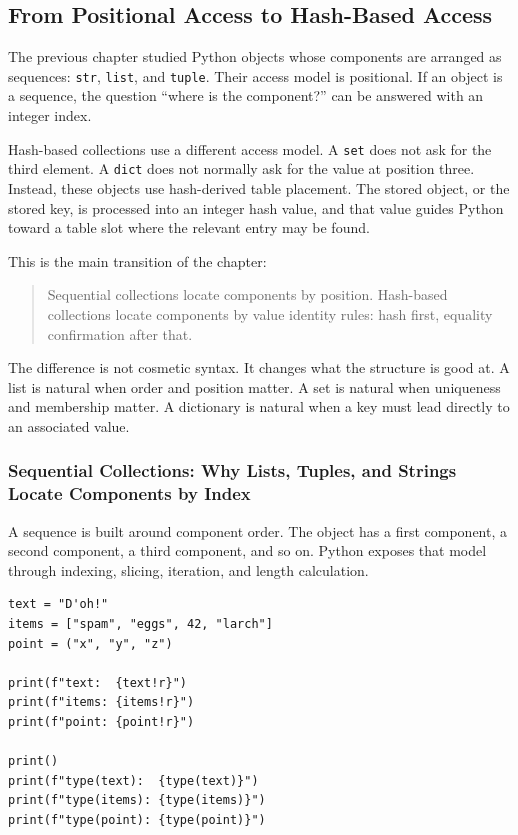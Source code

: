 \subsection{From Positional Access to Hash-Based Access}

The previous chapter studied Python objects whose components are arranged as sequences: \texttt{str}, \texttt{list}, and \texttt{tuple}. Their access model is positional. If an object is a sequence, the question ``where is the component?'' can be answered with an integer index.

Hash-based collections use a different access model. A \texttt{set} does not ask for the third element. A \texttt{dict} does not normally ask for the value at position three. Instead, these objects use hash-derived table placement. The stored object, or the stored key, is processed into an integer hash value, and that value guides Python toward a table slot where the relevant entry may be found.

This is the main transition of the chapter:

\begin{quote}
Sequential collections locate components by position. Hash-based collections locate components by value identity rules: hash first, equality confirmation after that.
\end{quote}

The difference is not cosmetic syntax. It changes what the structure is good at. A list is natural when order and position matter. A set is natural when uniqueness and membership matter. A dictionary is natural when a key must lead directly to an associated value.

\subsubsection{Sequential Collections: Why Lists, Tuples, and Strings Locate Components by Index}

A sequence is built around component order. The object has a first component, a second component, a third component, and so on. Python exposes that model through indexing, slicing, iteration, and length calculation.

\begin{verbatim}
text = "D'oh!"
items = ["spam", "eggs", 42, "larch"]
point = ("x", "y", "z")

print(f"text:  {text!r}")
print(f"items: {items!r}")
print(f"point: {point!r}")

print()
print(f"type(text):  {type(text)}")
print(f"type(items): {type(items)}")
print(f"type(point): {type(point)}")
\end{verbatim}

